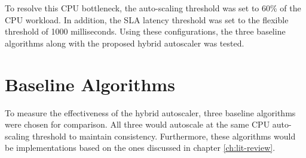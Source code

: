 To resolve this CPU bottleneck, the auto-scaling threshold was set to 60\% of the CPU workload. In addition, the SLA latency threshold was set to the flexible threshold of 1000 milliseconds. Using these configurations, the three baseline algorithms along with the proposed hybrid autoscaler was tested.\par

\section{Baseline Algorithms}
\label{sec:ch6-baseline-algos}

To measure the effectiveness of the hybrid autoscaler, three baseline algorithms were chosen for comparison. All three would autoscale at the same CPU auto-scaling threshold to maintain consistency. Furthermore, these algorithms would be implementations based on the ones discussed in chapter \ref{ch:lit-review}.\par

